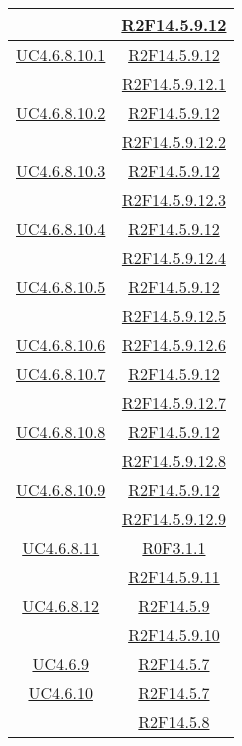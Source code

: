 \begin{longtable}{|c|c|}
& \hyperlink{R2F14.5.9.12}{R2F14.5.9.12}\\
\hline
\hyperlink{UC4.6.8.10.1}{UC4.6.8.10.1} & \hyperlink{R2F14.5.9.12}{R2F14.5.9.12}\\
& \hyperlink{R2F14.5.9.12.1}{R2F14.5.9.12.1}\\
\hline
\hyperlink{UC4.6.8.10.2}{UC4.6.8.10.2} & \hyperlink{R2F14.5.9.12}{R2F14.5.9.12}\\
& \hyperlink{R2F14.5.9.12.2}{R2F14.5.9.12.2}\\
\hline
\hyperlink{UC4.6.8.10.3}{UC4.6.8.10.3} & \hyperlink{R2F14.5.9.12}{R2F14.5.9.12}\\
& \hyperlink{R2F14.5.9.12.3}{R2F14.5.9.12.3}\\
\hline
\hyperlink{UC4.6.8.10.4}{UC4.6.8.10.4} & \hyperlink{R2F14.5.9.12}{R2F14.5.9.12}\\
& \hyperlink{R2F14.5.9.12.4}{R2F14.5.9.12.4}\\
\hline
\hyperlink{UC4.6.8.10.5}{UC4.6.8.10.5} & \hyperlink{R2F14.5.9.12}{R2F14.5.9.12}\\
& \hyperlink{R2F14.5.9.12.5}{R2F14.5.9.12.5}\\
\hline
\hyperlink{UC4.6.8.10.6}{UC4.6.8.10.6} & \hyperlink{R2F14.5.9.12.6}{R2F14.5.9.12.6}\\
\hline
\hyperlink{UC4.6.8.10.7}{UC4.6.8.10.7} & \hyperlink{R2F14.5.9.12}{R2F14.5.9.12}\\
& \hyperlink{R2F14.5.9.12.7}{R2F14.5.9.12.7}\\
\hline
\hyperlink{UC4.6.8.10.8}{UC4.6.8.10.8} & \hyperlink{R2F14.5.9.12}{R2F14.5.9.12}\\
& \hyperlink{R2F14.5.9.12.8}{R2F14.5.9.12.8}\\
\hline
\hyperlink{UC4.6.8.10.9}{UC4.6.8.10.9} & \hyperlink{R2F14.5.9.12}{R2F14.5.9.12}\\
& \hyperlink{R2F14.5.9.12.9}{R2F14.5.9.12.9}\\
\hline
\hyperlink{UC4.6.8.11}{UC4.6.8.11} & \hyperlink{R0F3.1.1}{R0F3.1.1}\\
& \hyperlink{R2F14.5.9.11}{R2F14.5.9.11}\\
\hline
\hyperlink{UC4.6.8.12}{UC4.6.8.12} & \hyperlink{R2F14.5.9}{R2F14.5.9}\\
& \hyperlink{R2F14.5.9.10}{R2F14.5.9.10}\\
\hline
\hyperlink{UC4.6.9}{UC4.6.9} & \hyperlink{R2F14.5.7}{R2F14.5.7}\\
\hline
\hyperlink{UC4.6.10}{UC4.6.10} & \hyperlink{R2F14.5.7}{R2F14.5.7}\\
& \hyperlink{R2F14.5.8}{R2F14.5.8}\\

\end{longtable}
